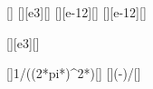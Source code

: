 [\henry]
[\kilo\ohm][e3][\ohm]
[\pico\farad\per\meter][e-12][\farad\per\meter]
[\pico\farad][e-12][\farad]

[\kilo\hertz][e3][\hertz]

[]{1/((2*pi*\fzX)^2*\LpX)}[\farad]
[]{(\CX-\CwX)/\cpX}[\meter]
